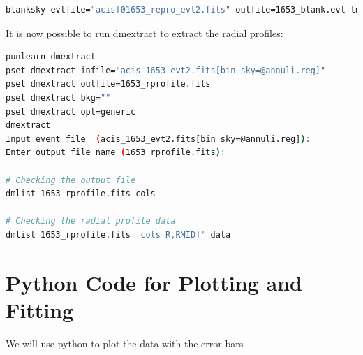 \documentclass[a4paper,12pt]{article}
\begin{document}
\begin{lstlisting}[language=bash]
    blanksky evtfile="acisf01653_repro_evt2.fits" outfile=1653_blank.evt tmpdir=./ mode=h
\end{lstlisting}

It is now possible to run dmextract to extract the radial profiles:

\begin{lstlisting}[language=bash]
punlearn dmextract
pset dmextract infile="acis_1653_evt2.fits[bin sky=@annuli.reg]"
pset dmextract outfile=1653_rprofile.fits
pset dmextract bkg=""
pset dmextract opt=generic
dmextract
Input event file  (acis_1653_evt2.fits[bin sky=@annuli.reg]): 
Enter output file name (1653_rprofile.fits):

# Checking the output file
dmlist 1653_rprofile.fits cols 

# Checking the radial profile data
dmlist 1653_rprofile.fits'[cols R,RMID]' data
\end{lstlisting}

\section{Python Code for Plotting and Fitting}
We will use python to plot the data with the error bars
\end{document}
